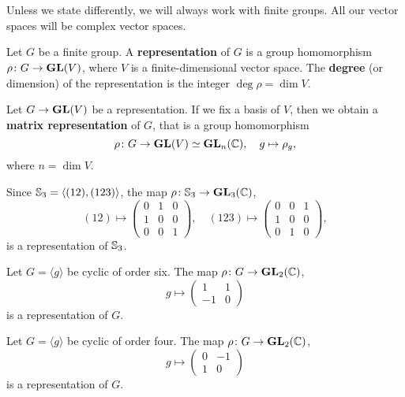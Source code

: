 \chapter{} 


Unless we state differently, we will always work
with finite groups. All our vector spaces will
be complex vector spaces. 

\begin{definition}
    Let $G$ be a finite group. A \textbf{representation}
    of $G$ is a group homomorphism $\rho\colon G\to\mathbf{GL}(V)$, where
    $V$ is a finite-dimensional vector space. The \textbf{degree} (or dimension) 
    of the representation is the integer $\deg\rho=\dim V$. 
\end{definition}

Let $G\to\mathbf{GL}(V)$ be a representation. 
If we fix a basis of $V$, then we obtain
a \textbf{matrix representation} of $G$, that is a 
group homomorphism 
\[
\rho\colon G\to\mathbf{GL}(V)\simeq\mathbf{GL}_n(\mathbb{C}),
\quad 
g\mapsto\rho_g,
\]
where
$n=\dim V$. 

\begin{example}
Since $\mathbb{S}_3=\langle (12),(123)\rangle$, the map $\rho\colon \mathbb{S}_3\to\mathbf{GL}_3(\mathbb{C})$,
\[
(12)\mapsto\begin{pmatrix}
0 & 1 & 0\\
1 & 0 & 0\\
0 & 0 & 1
\end{pmatrix},\quad
(123)\mapsto\begin{pmatrix}
0 & 0 & 1\\
1 & 0 & 0\\
0 & 1 & 0
\end{pmatrix},
\] 
is a representation of $\mathbb{S}_3$. 
\end{example}

\begin{example}
Let $G=\langle g\rangle$ be cyclic of order six. 
The map $\rho\colon G\to\mathbf{GL}_2(\mathbb{C})$, 
\[
g\mapsto
\begin{pmatrix}
1&1\\
-1&0
\end{pmatrix}
\] 
is a representation of $G$. 
\end{example}

\begin{example}
Let $G=\langle g\rangle$ be cyclic of order four. 
The map $\rho\colon G\to\mathbf{GL}_2(\mathbb{C})$, 
\[
g\mapsto
\begin{pmatrix}
0&-1\\
1&0
\end{pmatrix}
\] 
is a representation of $G$. 
\end{example}

